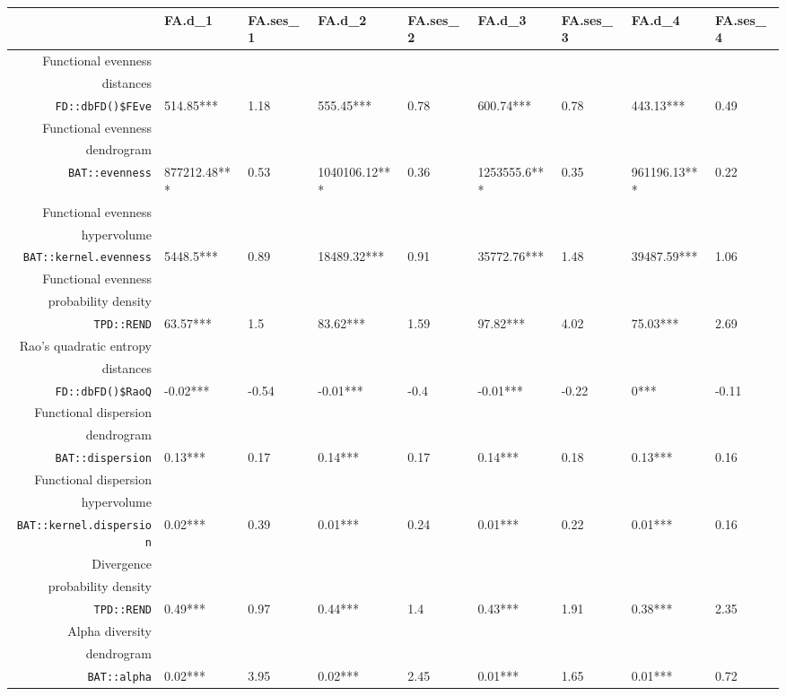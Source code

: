 \begin{table}[ht]
\scriptsize
\centering
\begin{tabular}{rllllllll}
  \hline
 & FA.d\_1 & FA.ses\_1 & FA.d\_2 & FA.ses\_2 & FA.d\_3 & FA.ses\_3 & FA.d\_4 & FA.ses\_4 \\ 
  \hline
Functional evenness\\distances\\\texttt{FD::dbFD()\$FEve} & 514.85*** & 1.18 & 555.45*** & 0.78 & 600.74*** & 0.78 & 443.13*** & 0.49 \\ 
  Functional evenness\\dendrogram\\\texttt{BAT::evenness} & 877212.48*** & 0.53 & 1040106.12*** & 0.36 & 1253555.6*** & 0.35 & 961196.13*** & 0.22 \\ 
  Functional evenness\\hypervolume\\\texttt{BAT::kernel.evenness} & 5448.5*** & 0.89 & 18489.32*** & 0.91 & 35772.76*** & 1.48 & 39487.59*** & 1.06 \\ 
  Functional evenness\\probability density\\\texttt{TPD::REND} & 63.57*** & 1.5 & 83.62*** & 1.59 & 97.82*** & 4.02 & 75.03*** & 2.69 \\ 
  Rao's quadratic entropy\\distances\\\texttt{FD::dbFD()\$RaoQ} & -0.02*** & -0.54 & -0.01*** & -0.4 & -0.01*** & -0.22 & 0*** & -0.11 \\ 
  Functional dispersion\\dendrogram\\\texttt{BAT::dispersion} & 0.13*** & 0.17 & 0.14*** & 0.17 & 0.14*** & 0.18 & 0.13*** & 0.16 \\ 
  Functional dispersion\\hypervolume\\\texttt{BAT::kernel.dispersion} & 0.02*** & 0.39 & 0.01*** & 0.24 & 0.01*** & 0.22 & 0.01*** & 0.16 \\ 
  Divergence\\probability density\\\texttt{TPD::REND} & 0.49*** & 0.97 & 0.44*** & 1.4 & 0.43*** & 1.91 & 0.38*** & 2.35 \\ 
  Alpha diversity\\dendrogram\\\texttt{BAT::alpha} & 0.02*** & 3.95 & 0.02*** & 2.45 & 0.01*** & 1.65 & 0.01*** & 0.72 \\ 

\end{tabular}
\end{table}
